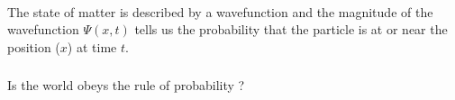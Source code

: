 \begin{frame}  
    \begin{tcolorbox3}[Conclusion]
        ~~\\
       {The state of matter is described by a wavefunction and the magnitude of the wavefunction $ \Psi(x,t)$ 
       tells us the probability that the particle is at or near the position ($x$) at time $t$.}
    \end{tcolorbox3} 
\end{frame} 

\begin{frame}
    \frametitle{}
    \centering
    {
    {Is the world obeys the rule of probability ?}
    }
\end{frame}

